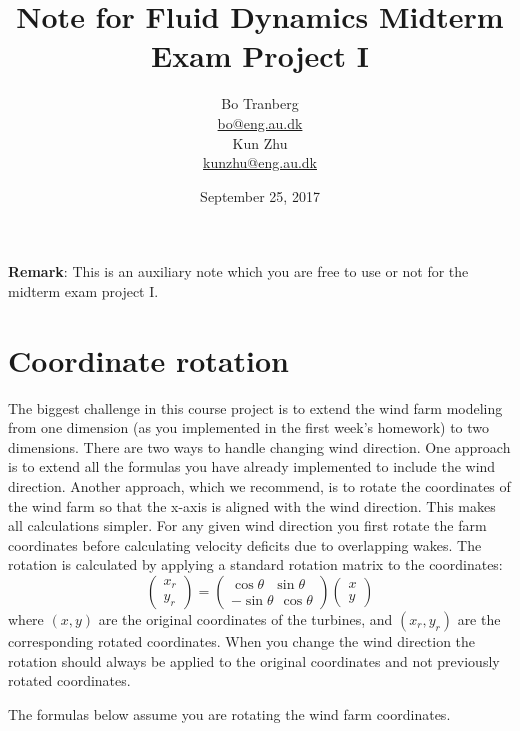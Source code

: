 \documentclass[a4paper, 11pt]{article}
\title{Note for Fluid Dynamics Midterm Exam Project I}
\author{Bo Tranberg\\\href{mailto:bo@eng.au.dk}{\small bo@eng.au.dk}\medskip\\ Kun Zhu\\\href{mailto:kunzhu@eng.au.dk}{\small kunzhu@eng.au.dk}}
\date{September 25, 2017}
\begin{document}
\maketitle

\large{
	\textbf{Remark}: This is an auxiliary note which you are free to use or not for the midterm exam project I. 
	}

\section{Coordinate rotation}
The biggest challenge in this course project is to extend the wind farm modeling from one dimension (as you implemented in the first week's homework) to two dimensions. There are two ways to handle changing wind direction. One approach is to extend all the formulas you have already implemented to include the wind direction. Another approach, which we recommend, is to rotate the coordinates of the wind farm so that the x-axis is aligned with the wind direction. This makes all calculations simpler. For any given wind direction you first rotate the farm coordinates before calculating velocity deficits due to overlapping wakes. The rotation is calculated by applying a standard rotation matrix to the coordinates:
\begin{equation}
	\begin{pmatrix}
	x_r \\
	y_r
	\end{pmatrix}
	=
	\begin{pmatrix}
	\cos \theta \ \ \  \sin \theta\\
	-\sin \theta \ \ \cos \theta
	\end{pmatrix}
	\begin{pmatrix}
	x \\
	y
	\end{pmatrix}
\end{equation}
where $(x,y)$ are the original coordinates of the turbines, and $(x_r,y_r)$ are the corresponding rotated coordinates. When you change the wind direction the rotation should always be applied to the original coordinates and not previously rotated coordinates.

The formulas below assume you are rotating the wind farm coordinates.
\end{document}
